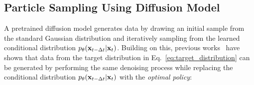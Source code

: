 

\vspace{-0.4\baselineskip}
\subsection{Particle Sampling Using Diffusion Model}
\vspace{-0.5\baselineskip}
\label{sec:motivation}

A pretrained diffusion model generates data by drawing an initial sample from the standard Gaussian distribution and iteratively sampling from the learned conditional distribution $p_{\theta}(\mathbf{x}_{t-\Delta t} | \mathbf{x}_{t})$. 
Building on this, previous works~\cite{Levine:2018RL, Uehara:2024Bridging} have shown that data from the target distribution in Eq.~\ref{eq:target_distribution} can be generated by performing the same denoising process while replacing the conditional distribution $p_{\theta}(\mathbf{x}_{t-\Delta t} | \mathbf{x}_{t})$ with the \emph{optimal policy}:

